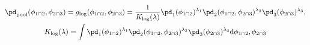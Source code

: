 \begin{equation}
\begin{gathered}
  \pd_{\text{pool}} (\phi_{1 \cap 2}, \phi_{2 \cap 3}) =
  g_{\text{log}}(\phi_{1 \cap 2}, \phi_{2 \cap 3}) =
  \frac{1}{K_{\text{log}}(\lambda)}
  \pd_{1}(\phi_{1 \cap 2})^{\lambda_{1}} 
  \pd_{2}(\phi_{1 \cap 2}, \phi_{2 \cap 3})^{\lambda_{2}}
  \pd_{3}(\phi_{2 \cap 3})^{\lambda_{3}}, \\
  K_{\text{log}}(\lambda) = 
  \int
    \pd_{1}(\phi_{1 \cap 2})^{\lambda_{1}} 
    \pd_{2}(\phi_{1 \cap 2}, \phi_{2 \cap 3})^{\lambda_{2}}
    \pd_{3}(\phi_{2 \cap 3})^{\lambda_{3}}
  \text{d}\phi_{1 \cap 2}, \phi_{2 \cap 3}
  \label{eqn:pooled-prior-overall}
\end{gathered}
\end{equation}